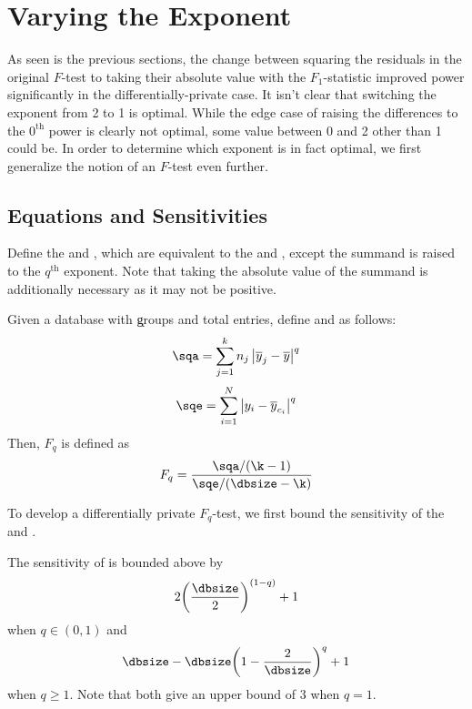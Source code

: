 \section{Varying the Exponent}
As seen is the previous sections, the change between squaring the residuals in the original $F$-test to taking their absolute value with the $F_1$-statistic improved power significantly in the differentially-private case. It isn't clear that switching the exponent from 2 to 1 is optimal. While the edge case of raising the differences to the $0^{\text{th}}$ power is clearly not optimal, some value between 0 and 2 other than 1 could be. In order to determine which exponent is in fact optimal, we first generalize the notion of an $F$-test even further. 

\subsection{Equations and Sensitivities}
Define the \sqa and \sqe, which are equivalent to the \ssa and \sse, except the summand is raised to the $q^{\text{th}}$ exponent. Note that taking the absolute value of the summand is additionally necessary as it may not be positive. 
\begin{definition}[$F_q$] \label{def:Fq} 
Given a database \x with \k groups and \dbsize total entries, define \sqa and \sqe as follows:
%
\begin{equation*}
\sqa = \sum_{j=1}^k n_j \left\vert \overline{y}_j - \overline{y} \right\vert^q
\end{equation*}
%
\begin{equation*}
\sqe = \sum_{i=1}^N \left\vert y_i - \overline{y}_{c_i} \right\vert^q
\end{equation*}
%
Then, $F_q$ is defined as
%
\begin{equation*}
F_q = \frac{\sqa/(\k-1)}{\sqe/(\dbsize-\k)}
\end{equation*}
%
\end{definition}
To develop a differentially private $F_q$-test, we first bound the sensitivity of the \sqa and \sqe.
\begin{theorem} \label{thm:SQEsens} 
The sensitivity of \sqe is bounded above by
\begin{equation*}
2\bigg(\frac{\dbsize}{2}\bigg)^{(1-q)} + 1
\end{equation*}
when $q \in (0,1)$ and
\begin{equation*}
\dbsize - \dbsize\bigg(1-\frac{2}{\dbsize}\bigg)^q +1 
\end{equation*}
when $q\geq 1$. Note that both give an upper bound of 3 when $q=1$.
\end{theorem}
